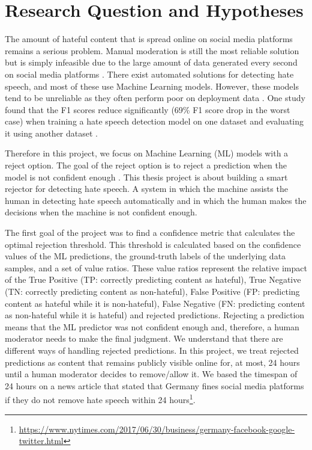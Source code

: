 \documentclass[a4paper]{article}
\begin{document}
\tableofcontents

\section{Research Question and Hypotheses}
The amount of hateful content that is spread online on social media platforms remains a serious problem. Manual moderation is still the most reliable solution but is simply infeasible due to the large amount of data generated every second on social media platforms \cite{balayn2021automatic}. There exist automated solutions for detecting hate speech, and most of these use Machine Learning models. However, these models tend to be unreliable as they often perform poor on deployment data \cite{balayn2021automatic, grondahl2018all}. One study found that the F1 scores reduce significantly (69\% F1 score drop in the worst case) when training a hate speech detection model on one dataset and evaluating it using another dataset \cite{grondahl2018all}.

Therefore in this project, we focus on Machine Learning (ML) models with a reject option. The goal of the reject option is to reject a prediction when the model is not confident enough \cite{hendrickx2021machine}. This thesis project is about building a smart rejector for detecting hate speech. A system in which the machine assists the human in detecting hate speech automatically and in which the human makes the decisions when the machine is not confident enough.

The first goal of the project was to find a confidence metric that calculates the optimal rejection threshold. This threshold is calculated based on the confidence values of the ML predictions, the ground-truth labels of the underlying data samples, and a set of value ratios. These value ratios represent the relative impact of the True Positive (TP: correctly predicting content as hateful), True Negative (TN: correctly predicting content as non-hateful), False Positive (FP: predicting content as hateful while it is non-hateful), False Negative (FN: predicting content as non-hateful while it is hateful) and rejected predictions. Rejecting a prediction means that the ML predictor was not confident enough and, therefore, a human moderator needs to make the final judgment. We understand that there are different ways of handling rejected predictions. In this project, we treat rejected predictions as content that remains publicly visible online for, at most, 24 hours until a human moderator decides to remove/allow it. We based the timespan of 24 hours on a news article that stated that Germany fines social media platforms if they do not remove hate speech within 24 hours\footnote{\url{https://www.nytimes.com/2017/06/30/business/germany-facebook-google-twitter.html}}.
\end{document}
